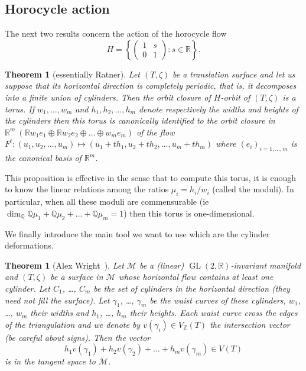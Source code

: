 \documentclass[a4paper,12pt]{article}
\def\bR{\mathbb{R}}
\def\bQ{\mathbb{Q}}
\def\bZ{\mathbb{Z}}
\def\cM{\mathcal{M}}
\def\GL{\operatorname{GL}}
\newtheorem{theorem}[definition]{Theorem}
\begin{document}
\subsection{Horocycle action}
The next two results concern the action of the horocycle flow
\[
H = \left\{\begin{pmatrix}
1 & s \\
0 & 1
\end{pmatrix}: s \in \bR \right\}.
\]
\begin{theorem}[essentially Ratner]
Let $(T, \zeta)$ be a translation surface and let us suppose that its
horizontal direction is completely periodic, that is, it decomposes into
a finite union of cylinders. Then the orbit closure of $H$-orbit of
$(T,\zeta)$ is a torus. If $w_1, \ldots, w_m$ and
$h_1, h_2, \ldots, h_m$ denote respectively the widths and heights of
the cylinders then this torus is canonically identified to the orbit
closure in $\bR^m \ (\bR w_1 e_1 \oplus \bR w_2 e_2 \oplus \ldots \oplus w_m e_m)$
of the flow $F^t: (u_1, u_2, \ldots, u_m) \mapsto (u_1 + t h_1, u_2 + t h_2, \ldots, u_m + t h_m)$
where $(e_i)_{i=1,\ldots,m}$ is the canonical basis of $\bR^m$.
\end{theorem}
This proposition is effective in the sense that to compute this torus, it is
enough to know the linear relations among the ratios $\mu_i = h_i / w_i$
(called the moduli). In particular, when all these moduli are commensurable
(ie $\dim_\bQ \bQ \mu_1 + \bQ \mu_2 + \ldots + \bQ \mu_m = 1$) then this
torus is one-dimensional.

We finally introduce the main tool we want to use which are the cylinder deformations.
\begin{theorem}[Alex Wright~\cite{Wright-cylinder-deformations}]
Let $\cM$ be a (linear) $\GL(2,\bR)$-invariant manifold and $(T,\zeta)$ be a surface
in $\cM$ whose horizontal flow contains at least one cylinder. Let $C_1$, \ldots, $C_m$
be the set of cylinders in the horizontal direction (they need not fill the surface).
Let $\gamma_1$, \ldots, $\gamma_m$ be the waist curves of these cylinders, $w_1$, \ldots, $w_m$
their widths and $h_1$, \ldots, $h_m$ their heights.
Each waist curve cross the edges of the triangulation and we denote by $v(\gamma_i) \in V_\bZ(T)$ the
intersection vector (be careful about signs). Then the vector
\[
h_1 v(\gamma_1) + h_2 v(\gamma_2) + \ldots + h_m v(\gamma_m) \in V(T)
\]
is in the tangent space to $\cM$.
\end{theorem}
\end{document}
